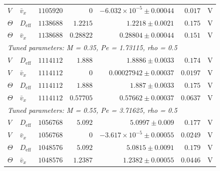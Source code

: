 \begin{longtable}{llrrrrc}
$V$ & $\bar v_x$ & $1105920$ & $0$ & $-6.032\times10^{-5} \pm 0.00044$ & $0.017$ & V \\
$\Theta$ & $D_{\mathrm{eff}}$ & $1138688$ & $1.2215$ & $1.2218 \pm 0.0021$ & $0.175$ & V \\
$\Theta$ & $\bar v_x$ & $1138688$ & $0.28822$ & $0.28804 \pm 0.00044$ & $0.151$ & V \\
\multicolumn{7}{l}{\textit{Tuned parameters: M = 0.35, Pe = 1.73115, rho = 0.5}} \\
$V$ & $D_{\mathrm{eff}}$ & $1114112$ & $1.888$ & $1.8886 \pm 0.0033$ & $0.174$ & V \\
$V$ & $\bar v_x$ & $1114112$ & $0$ & $0.00027942 \pm 0.00037$ & $0.0197$ & V \\
$\Theta$ & $D_{\mathrm{eff}}$ & $1114112$ & $1.888$ & $1.887 \pm 0.0033$ & $0.175$ & V \\
$\Theta$ & $\bar v_x$ & $1114112$ & $0.57705$ & $0.57662 \pm 0.00037$ & $0.0637$ & V \\
\multicolumn{7}{l}{\textit{Tuned parameters: M = 0.55, Pe = 3.71625, rho = 0.5}} \\
$V$ & $D_{\mathrm{eff}}$ & $1056768$ & $5.092$ & $5.0997 \pm 0.009$ & $0.177$ & V \\
$V$ & $\bar v_x$ & $1056768$ & $0$ & $-3.617\times10^{-5} \pm 0.00055$ & $0.0249$ & V \\
$\Theta$ & $D_{\mathrm{eff}}$ & $1048576$ & $5.092$ & $5.0815 \pm 0.0091$ & $0.179$ & V \\
$\Theta$ & $\bar v_x$ & $1048576$ & $1.2387$ & $1.2382 \pm 0.00055$ & $0.0446$ & V \\
\hline
\end{longtable}
\endgroup

